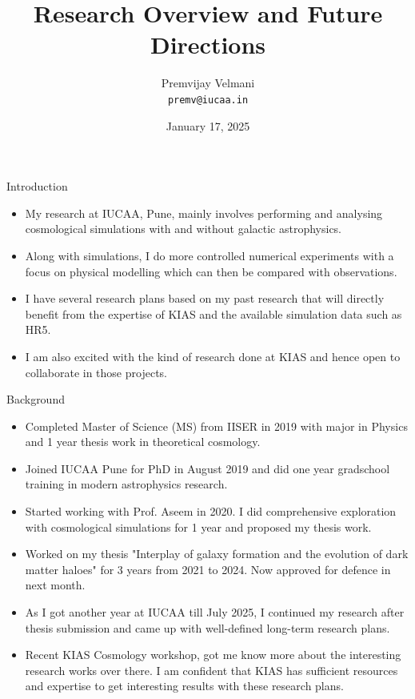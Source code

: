 \documentclass{beamer}
\title[Research Overview]{Research Overview and Future Directions}
\author[Premvijay Velmani]{Premvijay Velmani \\ \texttt{premv@iucaa.in}}
\institute[IUCAA]{Inter-University Centre for Astronomy and Astrophysics (IUCAA)}
\date[KIAS Interview]{January 17, 2025}
\begin{document}
\begin{frame}
    \titlepage
\end{frame}



\begin{frame}{Introduction}
\begin{itemize}
\item My research at IUCAA, Pune, mainly involves performing and analysing cosmological simulations with and without galactic astrophysics.
\item Along with simulations, I do more controlled numerical experiments with a focus on physical modelling which can then be compared with observations.
\item I have several research plans based on my past research that will directly benefit from the expertise of KIAS and the available simulation data such as HR5. 
\item I am also excited with the kind of research done at KIAS and hence open to collaborate in those projects.
\end{itemize}
\end{frame}

\begin{frame}{Background}
    \begin{itemize}
        \item Completed Master of Science (MS) from IISER in 2019 with major in Physics and 1 year thesis work in theoretical cosmology.
        \item Joined IUCAA Pune for PhD in August 2019 and did one year gradschool training in modern astrophysics research.
        \item Started working with Prof. Aseem in 2020. I did comprehensive exploration with cosmological simulations for 1 year and proposed my thesis work.
        \item Worked on my thesis "Interplay of galaxy formation and the evolution of dark matter haloes" for 3 years from 2021 to 2024. Now approved for defence in next month.
        \item As I got another year at IUCAA till July 2025, I continued my research after thesis submission and came up with well-defined long-term research plans. 
        \item Recent KIAS Cosmology workshop, got me know more about the interesting research works over there. I am confident that KIAS has sufficient resources and expertise to get interesting results with these research plans.
    \end{itemize}
\end{frame}
\end{document}
